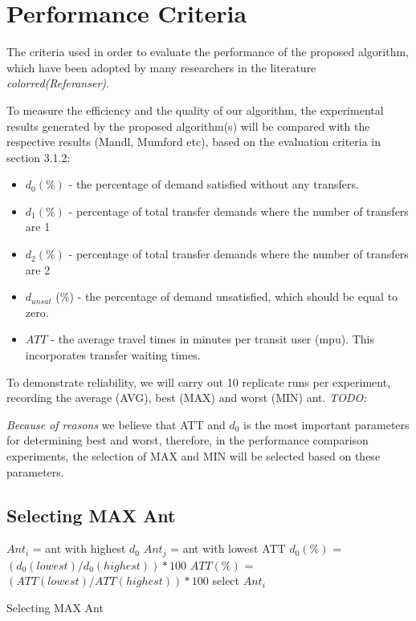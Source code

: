 \section{Performance Criteria}

The criteria used in order to evaluate the performance of the proposed algorithm, which have been adopted by many researchers in the literature \emph{color{red}(Referanser)}.

To measure the efficiency and the quality of our algorithm, the experimental results generated by the proposed algorithm(s) will be compared with the respective results (Mandl, Mumford etc), based on the evaluation criteria in section 3.1.2: 

\begin{itemize}
\item $d_0 (\%)$ - the percentage of demand satisfied without any transfers.
\item $d_1 (\%)$ - percentage of total transfer demands where the number of transfers are 1
\item $d_2 (\%)$ - percentage of total transfer demands where the number of transfers are 2
\item $d_{unsat}$ (\%) - the percentage of demand unsatisfied, which should be equal to zero.
\item $ATT$  - the average travel times in minutes per transit user (mpu). This incorporates transfer waiting times. 
\end{itemize}

To demonstrate reliability, we will carry out 10 replicate runs per experiment, recording the average (AVG), best (MAX) and worst (MIN) ant.  
\emph{\color{red} TODO:}

\emph{\color{red} Because of reasons }we believe that ATT and $d_0$ is the most important parameters for determining best and worst, therefore, in the performance comparison experiments, the selection of MAX and MIN will be selected based on these parameters.

\subsection{Selecting MAX Ant}

\begin{algorithm}[H]
$Ant_{i}$ = ant with highest $d_0$\;
$Ant_{j}$ = ant with lowest ATT\;
{
	$d_0(\%)$ = $(d_0(lowest) / d_0(highest))*100$\;
	$ATT(\%)$ = $(ATT(lowest) / ATT(highest))*100$\;
	{
		select $Ant_{i}$
	}
}
 \caption{Selecting MAX Ant}
\end{algorithm}

